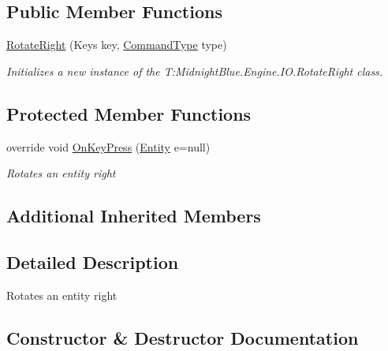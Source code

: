 \subsection*{Public Member Functions}
\begin{DoxyCompactItemize}
\item 
\hyperlink{class_midnight_blue_1_1_engine_1_1_i_o_1_1_rotate_right_a3902644dd4a0430c043b6e3924829ad7}{Rotate\+Right} (Keys key, \hyperlink{namespace_midnight_blue_1_1_engine_1_1_i_o_a8bc3f159399ecadd590f7df1b54354b0}{Command\+Type} type)
\begin{DoxyCompactList}\small\item\em Initializes a new instance of the T\+:\+Midnight\+Blue.\+Engine.\+I\+O.\+Rotate\+Right class. \end{DoxyCompactList}\end{DoxyCompactItemize}
\subsection*{Protected Member Functions}
\begin{DoxyCompactItemize}
\item 
override void \hyperlink{class_midnight_blue_1_1_engine_1_1_i_o_1_1_rotate_right_a6f3a6e2c0bed610a90f0333b38872cb4}{On\+Key\+Press} (\hyperlink{class_midnight_blue_1_1_engine_1_1_entity_component_1_1_entity}{Entity} e=null)
\begin{DoxyCompactList}\small\item\em Rotates an entity right \end{DoxyCompactList}\end{DoxyCompactItemize}
\subsection*{Additional Inherited Members}


\subsection{Detailed Description}
Rotates an entity right 



\subsection{Constructor \& Destructor Documentation}
\hypertarget{class_midnight_blue_1_1_engine_1_1_i_o_1_1_rotate_right_a3902644dd4a0430c043b6e3924829ad7}{}\label{class_midnight_blue_1_1_engine_1_1_i_o_1_1_rotate_right_a3902644dd4a0430c043b6e3924829ad7} 
